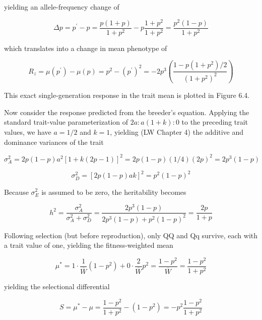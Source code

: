 \documentclass{article}
\begin{document}
yielding an allele-frequency change of

\begin{equation}
\Delta p=p^{\prime}-p=\frac{p(1+p)}{1+p^{2}}-p\frac{1+p^{2}}{1+p^{2}}=\frac{p^{2}(1-p)}{1+p^{2}}
\end{equation}

which translates into a change in mean phenotype of

\begin{equation}
R_{z}=\mu(p^{\prime})-\mu(p)=p^{2}-(p^{\prime})^{2}=-2p^{3}\left(\frac{1-p(1+p^{2})/2}{(1+p^{2})^{2}}\right)
\tag{6.16b}
\label{eq:6_16b}
\end{equation}

This exact single-generation response in the trait mean is plotted in Figure 6.4.

Now consider the response predicted from the breeder’s equation. Applying the standard trait-value parameterization of  $ 2a : a(1 + k) : 0 $ to the preceding trait values, we have  $ a = 1/2 $ and  $ k = 1 $, yielding (LW Chapter 4) the additive and dominance variances of the trait

\begin{equation}
\sigma_{A}^{2}=2p(1-p)a^{2}[1+k(2p-1)]^{2}=2p(1-p)(1/4)(2p)^{2}=2p^{3}(1-p)
\end{equation}

\begin{equation}
\sigma_{D}^{2}=[2p(1-p)a k]^{2}=p^{2}(1-p)^{2}
\end{equation}

Because  $ \sigma_{E}^{2} $ is assumed to be zero, the heritability becomes

\begin{equation}
h^{2}=\frac{\sigma_{A}^{2}}{\sigma_{A}^{2}+\sigma_{D}^{2}}=\frac{2p^{3}(1-p)}{2p^{3}(1-p)+p^{2}(1-p)^{2}}=\frac{2p}{1+p}
\tag{6.16c}
\label{eq:6_16c}
\end{equation}

Following selection (but before reproduction), only QQ and Qq survive, each with a trait value of one, yielding the fitness-weighted mean

\begin{equation}
\mu^{*}=1\cdot\frac{1}{\overline{W}}\left(1-p^{2}\right)+0\cdot\frac{2}{\overline{W}}p^{2}=\frac{1-p^{2}}{\overline{W}}=\frac{1-p^{2}}{1+p^{2}}
\tag{6.16d}
\label{eq:6_16d}
\end{equation}

yielding the selectional differential

\begin{equation}
S=\mu^{*}-\mu=\frac{1-p^{2}}{1+p^{2}}-\left(1-p^{2}\right)=-p^{2}\frac{1-p^{2}}{1+p^{2}}
\tag{6.16e}
\label{eq:6_16e}
\end{equation}
\end{document}
